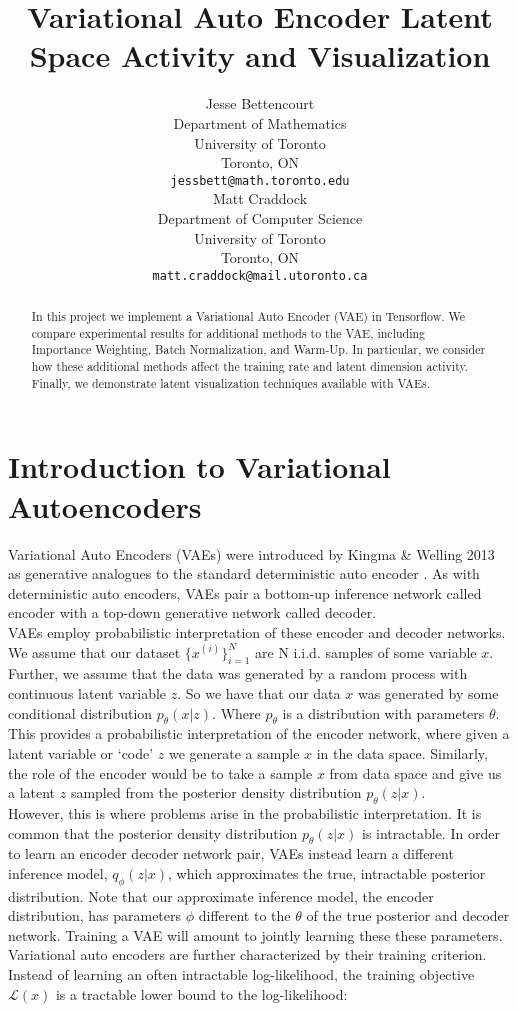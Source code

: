 \documentclass{article} %
\title{Variational Auto Encoder Latent Space Activity and Visualization}
\author{
Jesse Bettencourt\\
Department of Mathematics\\
University of Toronto\\
Toronto, ON \\
\texttt{jessbett@math.toronto.edu} \\
\And
Matt Craddock\\
Department of Computer Science\\
University of Toronto\\
Toronto, ON \\
\texttt{matt.craddock@mail.utoronto.ca} \\
}
\renewcommand{\L}{\mathcal{L}}
\begin{document}
\maketitle

\begin{abstract}
In this project we implement a Variational Auto Encoder (VAE) in Tensorflow. We compare experimental results for additional methods to the VAE, including Importance Weighting, Batch Normalization, and Warm-Up. In particular, we consider how these additional methods affect the training rate and latent dimension activity. Finally, we demonstrate latent visualization techniques available with VAEs.
\end{abstract}

\section{Introduction to Variational Autoencoders}

Variational Auto Encoders (VAEs) were introduced by Kingma \& Welling 2013 as generative analogues to the standard deterministic auto encoder \cite{Kingma2013}. As with deterministic auto encoders, VAEs pair a bottom-up inference network called encoder with a top-down generative network called decoder.\\  
VAEs employ probabilistic interpretation of these encoder and decoder networks. We assume that our dataset $\{x^{(i)}\}_{i=1}^N$ are N i.i.d. samples of some variable $x$. Further, we assume that the data was generated by a random process with continuous latent variable $z$. So we have that our data $x$ was generated by some conditional distribution $p_\theta(x|z)$. Where $p_\theta$ is a distribution with parameters $\theta$. This provides a probabilistic interpretation of the encoder network, where given a latent variable or `code' $z$ we generate a sample $x$ in the data space. Similarly, the role of the encoder would be to take a sample $x$ from data space and give us a latent $z$ sampled from the posterior density distribution $p_\theta(z|x)$.\\
However, this is where problems arise in the probabilistic interpretation. It is common that the posterior density distribution $p_\theta(z|x)$ is intractable. In order to learn an encoder decoder network pair, VAEs instead learn a different inference model, $q_\phi(z|x)$, which approximates the true, intractable posterior distribution. Note that our approximate inference model, the encoder distribution, has parameters $\phi$ different to the $\theta$ of the true posterior and decoder network. Training a VAE will amount to jointly learning these these parameters. \\
Variational auto encoders are further characterized by their training criterion. Instead of learning an often intractable log-likelihood, the training objective $\L(x)$ is a tractable lower bound to the log-likelihood:
\end{document}
